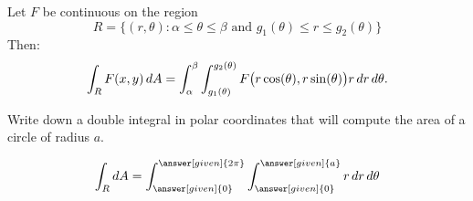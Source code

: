 \documentclass{ximera}
\begin{document}
\begin{theorem}
  Let $F$ be continuous on the region
  \[
  R=\{(r,\theta):\text{$\alpha\leq\theta\leq\beta$ and $g_1(\theta)\leq r\leq g_2(\theta)$}\}
  \]
  Then: 
  \[
  \int_R F(x,y)\mathop{}\!d A = \int_\alpha^\beta\int_{g_1(\theta)}^{g_2(\theta)} F\big(r\cos(\theta),r\sin(\theta)\big) r\mathop{}\!d r\mathop{}\!d \theta.
  \]
\end{theorem}

\begin{question}
  Write down a double integral in polar coordinates that will compute
  the area of a circle of radius $a$.
  \begin{prompt}
  \[
  \int_R \d A = \int_{\answer[given]{0}}^{\answer[given]{2\pi}}
  \int_{\answer[given]{0}}^{\answer[given]{a}}r \d r \d \theta 
  \]
  \end{prompt}
\end{question}
\end{document}
